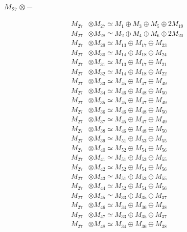 \subsubsection{$ M_{27}\otimes -$}
\begin{align*}
M_{27} &\otimes M_{27} \simeq M_{1} \oplus M_{3} \oplus M_{5} \oplus 2M_{19} \\
M_{27} &\otimes M_{28} \simeq M_{2} \oplus M_{4} \oplus M_{6} \oplus 2M_{20} \\
M_{27} &\otimes M_{29} \simeq M_{13} \oplus M_{17} \oplus M_{23} \\
M_{27} &\otimes M_{30} \simeq M_{14} \oplus M_{18} \oplus M_{24} \\
M_{27} &\otimes M_{31} \simeq M_{13} \oplus M_{17} \oplus M_{21} \\
M_{27} &\otimes M_{32} \simeq M_{14} \oplus M_{18} \oplus M_{22} \\
M_{27} &\otimes M_{33} \simeq M_{45} \oplus M_{47} \oplus M_{49} \\
M_{27} &\otimes M_{34} \simeq M_{46} \oplus M_{48} \oplus M_{50} \\
M_{27} &\otimes M_{35} \simeq M_{45} \oplus M_{47} \oplus M_{49} \\
M_{27} &\otimes M_{36} \simeq M_{46} \oplus M_{48} \oplus M_{50} \\
M_{27} &\otimes M_{37} \simeq M_{45} \oplus M_{47} \oplus M_{49} \\
M_{27} &\otimes M_{38} \simeq M_{46} \oplus M_{48} \oplus M_{50} \\
M_{27} &\otimes M_{39} \simeq M_{51} \oplus M_{53} \oplus M_{55} \\
M_{27} &\otimes M_{40} \simeq M_{52} \oplus M_{54} \oplus M_{56} \\
M_{27} &\otimes M_{41} \simeq M_{51} \oplus M_{53} \oplus M_{55} \\
M_{27} &\otimes M_{42} \simeq M_{52} \oplus M_{54} \oplus M_{56} \\
M_{27} &\otimes M_{43} \simeq M_{51} \oplus M_{53} \oplus M_{55} \\
M_{27} &\otimes M_{44} \simeq M_{52} \oplus M_{54} \oplus M_{56} \\
M_{27} &\otimes M_{45} \simeq M_{33} \oplus M_{35} \oplus M_{37} \\
M_{27} &\otimes M_{46} \simeq M_{34} \oplus M_{36} \oplus M_{38} \\
M_{27} &\otimes M_{47} \simeq M_{33} \oplus M_{35} \oplus M_{37} \\
M_{27} &\otimes M_{48} \simeq M_{34} \oplus M_{36} \oplus M_{38} \\

\end{align*}

